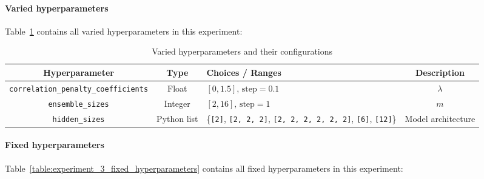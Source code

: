 \documentclass{article}
\begin{document}
\paragraph{Varied hyperparameters}
Table~\ref{table:experiment_3_varied_hyperparameters} contains all varied hyperparameters in this experiment: 

\begin{table}[H]
    \centering
    \begin{tabular}{|c|c|p{5cm}|c|}
        \hline
        Hyperparameter & Type & Choices / Ranges & Description \\
        \hline
        \small\texttt{correlation\_penalty\_coefficients} & Float & $[0, 1.5]\text{, step}=0.1$ & $\lambda$ \\
        \hline
        \small\texttt{ensemble\_sizes} & Integer & $[2, 16]\text{, step}=1$ & $m$ \\
        \hline
        \small\texttt{hidden\_sizes} & Python list & \{\texttt{[2]}, \texttt{[2, 2, 2]}, \texttt{[2, 2, 2, 2, 2, 2]}, \texttt{[6]}, \texttt{[12]}\} & Model architecture \\
        \hline
    \end{tabular}
    \caption{Varied hyperparameters and their configurations}
    \label{table:experiment_3_varied_hyperparameters}
\end{table}

\paragraph{Fixed hyperparameters}
Table~\ref{table:experiment_3_fixed_hyperparameters} contains all fixed hyperparameters in this experiment: 
\end{document}
